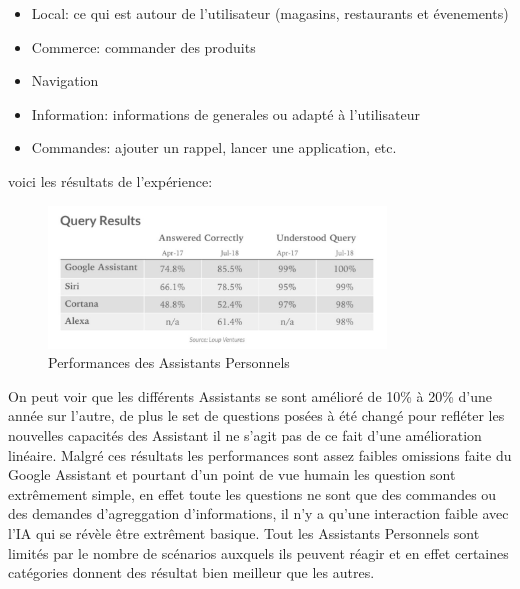 \begin{itemize}
    \item Local: ce qui est autour de l'utilisateur (magasins, restaurants et évenements)
    \item Commerce: commander des produits
    \item Navigation
    \item Information: informations de generales ou adapté à l'utilisateur
    \item Commandes: ajouter un rappel, lancer une application, etc. \newline
\end{itemize}

voici les résultats de l'expérience:
\begin{figure}[h]
    \centering
    \includegraphics[width=0.8\textwidth]{Images/vaqueryresult}
    \caption{Performances des Assistants Personnels}
    \label{fig:virtualassistantqueryresult}
\end{figure}

On peut voir que les différents Assistants se sont amélioré de 10\% à 20\% d'une année sur l'autre,
de plus le set de questions posées à été changé pour refléter les nouvelles capacités des Assistant
il ne s'agit pas de ce fait d'une amélioration linéaire. Malgré ces résultats les performances
sont assez faibles omissions faite du Google Assistant et pourtant d'un point de vue
humain les question sont extrêmement simple, en effet toute les questions ne sont que des commandes ou
des demandes d'agreggation d'informations, il n'y a qu'une interaction faible avec l'IA qui se révèle
être extrêment basique. Tout les Assistants Personnels sont limités par le nombre de scénarios auxquels
ils peuvent réagir et en effet certaines catégories donnent des résultat bien meilleur que les
autres. \newpage

